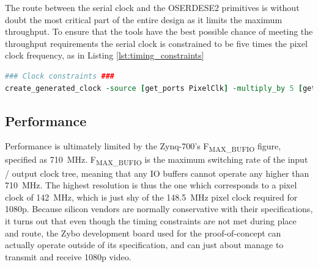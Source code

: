 The route between the serial clock and the OSERDESE2 primitives is without doubt the most critical part of the entire design as it limits the maximum throughput. To ensure that the tools have the best possible chance of meeting the throughput requirements the serial clock is constrained to be five times the pixel clock frequency, as in Listing \ref{lst:timing_constraints}

\begin{lstlisting}[caption={Serial clock timing constraints}, label={lst:timing_constraints}, language=tcl]
### Clock constraints ###
create_generated_clock -source [get_ports PixelClk] -multiply_by 5 [get_ports SerialClk]
\end{lstlisting}

\subsection{Performance}
Performance is ultimately limited by the Zynq-700's F\textsubscript{MAX\_BUFIO} figure, specified as \SI{710}{\mega\hertz}\cite{xilinx:ds187}. F\textsubscript{MAX\_BUFIO} is the maximum switching rate of the input / output clock tree, meaning that any IO buffers cannot operate any higher than \SI{710}{\mega\hertz}. The highest resolution is thus the one which corresponds to a pixel clock of \SI{142}{\mega\hertz}, which is just shy of the \SI{148.5}{\mega\hertz} pixel clock required for 1080p. Because silicon vendors are normally conservative with their specifications, it turns out that even though the timing constraints are not met during place and route, the Zybo development board used for the proof-of-concept can actually operate outside of its specification, and can just about manage to transmit and receive 1080p video.